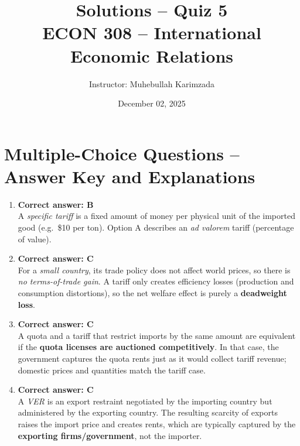 \documentclass[12pt]{article}
\title{Solutions -- Quiz 5\\ \vspace{5pt} \Large ECON 308 -- International Economic Relations}
\author{Instructor: Muhebullah Karimzada}
\date{December 02,  2025}
\begin{document}
\maketitle

\section*{Multiple-Choice Questions – Answer Key and Explanations}

\begin{enumerate}[label=\textbf{\arabic*.}]

\item \textbf{Correct answer: B} \\
A \textit{specific tariff} is a fixed amount of money per physical unit of the imported good (e.g.\ \$10 per ton).  
Option A describes an \emph{ad valorem} tariff (percentage of value).

\vspace{0.5em}

\item \textbf{Correct answer: C} \\
For a \textit{small country}, its trade policy does not affect world prices, so there is \emph{no terms-of-trade gain}.  
A tariff only creates efficiency losses (production and consumption distortions), so the net welfare effect is purely a \textbf{deadweight loss}.

\vspace{0.5em}

\item \textbf{Correct answer: C} \\
A quota and a tariff that restrict imports by the same amount are equivalent if the \textbf{quota licenses are auctioned competitively}.  
In that case, the government captures the quota rents just as it would collect tariff revenue; domestic prices and quantities match the tariff case.

\vspace{0.5em}

\item \textbf{Correct answer: C} \\
A \textit{VER} is an export restraint negotiated by the importing country but administered by the exporting country.  
The resulting scarcity of exports raises the import price and creates rents, which are typically captured by the \textbf{exporting firms/government}, not the importer.

\vspace{0.5em}


\end{enumerate}
\end{document}

